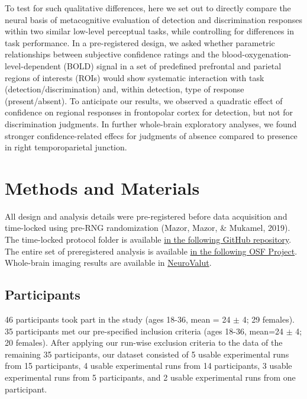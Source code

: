 \documentclass[12pt,twoside]{reedthesis}
\begin{document}
To test for such qualitative differences, here we set out to directly compare the neural basis of metacognitive evaluation of detection and discrimination responses within two similar low-level perceptual tasks, while controlling for differences in task performance. In a pre-registered design, we asked whether parametric relationships between subjective confidence ratings and the blood-oxygenation-level-dependent (BOLD) signal in a set of predefined prefrontal and parietal regions of interests (ROIs) would show systematic interaction with task (detection/discrimination) and, within detection, type of response (present/absent). To anticipate our results, we observed a quadratic effect of confidence on regional responses in frontopolar cortex for detection, but not for discrimination judgments. In further whole-brain exploratory analyses, we found stronger confidence-related effecs for judgments of absence compared to presence in right temporoparietal junction.

\hypertarget{methods-and-materials}{%
\section{Methods and Materials}\label{methods-and-materials}}

All design and analysis details were pre-registered before data acquisition and time-locked using pre-RNG randomization (Mazor, Mazor, \& Mukamel, 2019). The time-locked protocol folder is available \href{https://github.com/matanmazor/detectionVsDiscrimination_fMRI/tree/master/protocol\%20folder}{in the following GitHub repository}. The entire set of preregistered analysis is available \href{https://www.osf.io/98mv4}{in the following OSF Project}. Whole-brain imaging results are available in \href{https://neurovault.org/collections/VVLPQBWK/}{NeuroValut}.

\hypertarget{participants-7}{%
\subsection{Participants}\label{participants-7}}

46 participants took part in the study (ages 18-36, mean = 24 \(\pm\) 4; 29 females). 35 participants met our pre-specified inclusion criteria (ages 18-36, mean=24 \(\pm\) 4; 20 females). After applying our run-wise exclusion criteria to the data of the remaining 35 participants, our dataset consisted of 5 usable experimental runs from 15 participants, 4 usable experimental runs from 14 participants, 3 usable experimental runs from 5 participants, and 2 usable experimental runs from one participant.
\end{document}
